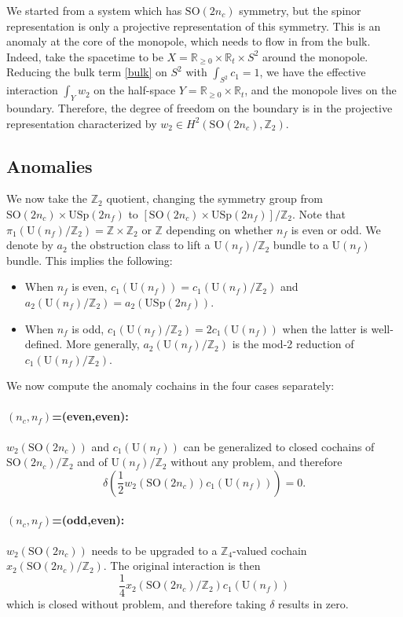 \documentclass[12pt]{article}
\numberwithin{equation}{section}
\def\bR{\mathbb{R}}
\def\bZ{\mathbb{Z}}
\def\U{\mathrm{U}}
\def\SO{\mathrm{SO}}
\def\USp{\mathrm{USp}}
\begin{document}
We started from a system which has $\SO(2n_c)$ symmetry,
but the spinor representation is only a projective representation of this symmetry.
This is an anomaly at the core of the monopole, which needs to flow in from the bulk.
Indeed, take the spacetime  to be $X=\bR_{\ge 0} \times \bR_t \times S^2$ around the monopole.
Reducing the bulk term \eqref{bulk} on $S^2$ with $\int_{S^2} c_1=1$, 
we have the  effective interaction $\int_Y w_2$
on the half-space $Y=\bR_{\ge 0}\times \bR_t$,
and the monopole lives on the boundary. 
Therefore, the degree of freedom on the boundary is in the projective representation characterized by 
$w_2\in H^2(\SO(2n_c),\bZ_2)$.

\subsection{Anomalies}
We now take the $\bZ_2$ quotient, changing the symmetry group from 
$\SO(2n_c)\times \USp(2n_f)$ to $[\SO(2n_c)\times \USp(2n_f)]/\bZ_2$.
Note that $\pi_1(\U(n_f)/\bZ_2)=\bZ\times \bZ_2$  or $\bZ$ depending on whether $n_f$ is even or odd.
We denote by $a_2$ the obstruction class to lift a $\U(n_f)/\bZ_2$ bundle to a $\U(n_f)$ bundle.
This implies the following:
\begin{itemize}
\item When $n_f$ is even, $c_1(\U(n_f)) = c_1(\U(n_f)/\bZ_2)$ and $a_2(\U(n_f)/\bZ_2)=a_2(\USp(2n_f))$.
\item When $n_f$ is odd, $c_1(\U(n_f)/\bZ_2)=2 c_1(\U(n_f))$ when the latter is well-defined.
More generally, $a_2(\U(n_f)/\bZ_2)$ is the mod-2 reduction of $c_1(\U(n_f)/\bZ_2)$.
\end{itemize}
We now compute the anomaly cochains in the four cases separately:
\paragraph{$(n_c,n_f)$=(even,even):}
$w_2(\SO(2n_c))$ and $c_1(\U(n_f))$ can be generalized to closed cochains of $\SO(2n_c)/\bZ_2$ 
and of $\U(n_f)/\bZ_2$
without any problem,
and therefore \begin{equation}
\delta\left(\frac12 w_2(\SO(2n_c)) c_1(\U(n_f))\right) = 0.
\end{equation}

\paragraph{$(n_c,n_f)$=(odd,even):}
$w_2(\SO(2n_c))$ needs to be upgraded to a $\bZ_4$-valued cochain $x_2(\SO(2n_c)/\bZ_2)$.
The original interaction is then \begin{equation}
\frac14 x_2(\SO(2n_c)/\bZ_2) c_1(\U(n_f))
\end{equation}
which is closed without problem,
and therefore taking $\delta$ results in zero.
\end{document}
